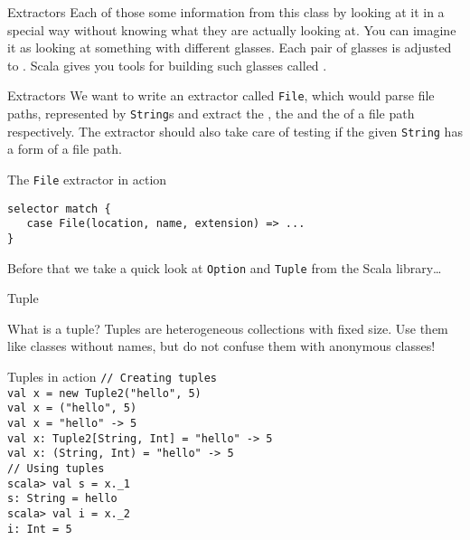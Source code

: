 \begin{frame}{Extractors}
Each of those  some information from this class by
looking at it in a special way without knowing what they are actually looking
at. You can imagine it as looking  at something with different glasses. Each
pair of glasses is adjusted to . Scala
gives you tools for building such glasses called .
\end{frame}

\begin{frame}[fragile]{Extractors}
We want to write an extractor called \lstinline!File!, which would parse file
paths, represented by \lstinline!String!s and extract the ,
the  and the  of a file path respectively.
The extractor should also take care of testing if the given \lstinline!String!
has a form of a file path.
\pause
\begin{exampleblock}{The \lstinline!File! extractor in action}
\begin{lstlisting}
selector match {
   case File(location, name, extension) => ...
}
\end{lstlisting}
\end{exampleblock}
\pause
Before that we take a quick look at \lstinline!Option! and \lstinline!Tuple!
from the Scala library\ldots
\end{frame}

\begin{frame}[fragile]{Tuple}
\begin{block}{What is a tuple?}
Tuples are heterogeneous collections with fixed size. Use them like classes
without names, but do not confuse them with anonymous classes!
\end{block}
\pause
\begin{exampleblock}{Tuples in action}
\lstinline!// Creating tuples!\\
\lstinline!val x = new Tuple2("hello", 5)!\\
\lstinline!val x = ("hello", 5)!\\
\lstinline!val x = "hello" -> 5!\\
\lstinline!val x: Tuple2[String, Int] = "hello" -> 5!\\
\lstinline!val x: (String, Int) = "hello" -> 5!\\
\lstinline!// Using tuples!\\
\lstinline!scala> val s = x._1!\\
\lstinline!s: String = hello!\\
\lstinline!scala> val i = x._2!\\
\lstinline!i: Int = 5!
\end{exampleblock}
\end{frame}

